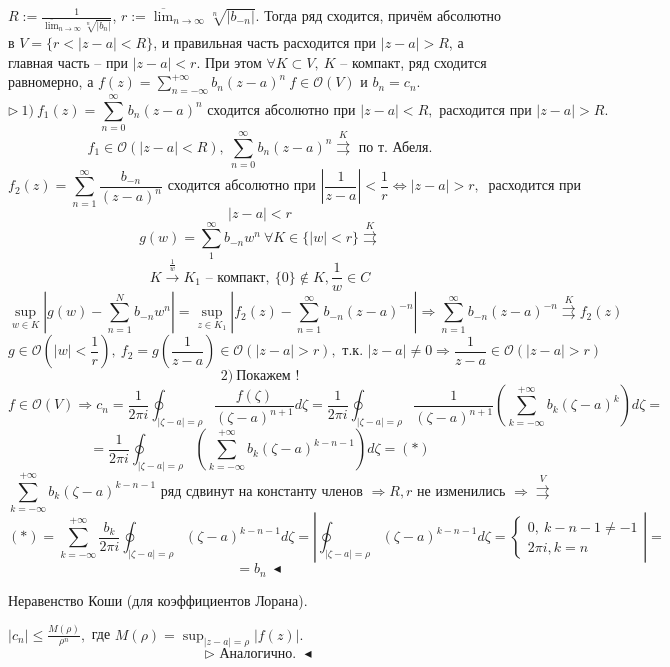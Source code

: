 $R := \frac{1}{\overline{\lim}_{n\to\infty} \sqrt[n]{|b_n|}}$, $r:= \overline{\lim}_{n\to\infty} \sqrt[n]{|b_{-n}|}.$ Тогда ряд сходится, причём абсолютно в $V = \{r < |z-a| < R\}$, и правильная часть расходится при $|z-a|>R$, а главная часть -- при $|z-a| < r$.
При этом $\forall K \subset V, \ K$ -- компакт, ряд сходится равномерно, а $f(z) = \sum_{n=-\infty}^{+\infty} b_n (z-a)^n \ f \in \mathcal{O}(V)$ и $b_n = c_n$.
\[\triangleright \ 1) \ f_1(z) = \sum_{n=0}^\infty b_n (z-a)^n \text{ сходится абсолютно при } |z-a| < R, \text{ расходится при } |z-a| > R.\]
\[f_1 \in \mathcal{O}(|z-a|< R), \ \sum_{n=0}^\infty b_n (z-a)^n \overset{K}{\rightrightarrows} \text{ по т. Абеля.}\]
\[f_2(z) = \sum_{n=1}^\infty \frac{b_{-n}}{(z-a)^n} \text{ сходится абсолютно при } \left|\frac{1}{z-a}\right| < \frac{1}{r} \Leftrightarrow |z-a| > r, \ \text{ расходится при}\]
\[|z-a| < r\]
\[g(w) = \sum_{1}^\infty b_{-n}w^n \ \forall K \in \{|w| < r\} \overset{K}{\rightrightarrows}\]
\[K \overset{\frac{1}{w}}{\to} K_1 \text{ -- компакт}, \ \{0\} \notin K, \frac{1}{w} \in C\]
\[\sup_{w \in K} \left|g(w)-\sum_{n=1}^N b_{-n} w^n\right| = \sup_{z \in K_1} \left|f_2(z) - \sum_{n=1}^\infty b_{-n} (z-a)^{-n}\right| \Rightarrow \sum_{n=1}^\infty b_{-n} (z-a)^{-n} \overset{K}{\rightrightarrows} f_2(z)\]
\[g \in \mathcal{O}(|w|<\frac{1}{r}), \ f_2 = g\left(\frac{1}{z-a}\right) \in \mathcal{O}(|z-a|>r), \text{ т.к. } |z-a|\neq 0 \Rightarrow \frac{1}{z-a} \in \mathcal{O}(|z-a|>r)\]
\[2) \ \text{Покажем } !\]
\[f \in \mathcal{O}(V) \Rightarrow c_n = \frac{1}{2\pi i} \oint_{|\zeta-a|=\rho} \frac{f(\zeta)}{(\zeta-a)^{n+1}}d\zeta = \frac{1}{2\pi i} \oint_{|\zeta-a|=\rho} \frac{1}{(\zeta-a)^{n+1}} \left(\sum_{k=-\infty}^{+\infty} b_k (\zeta-a)^k\right)d\zeta =\] 
\[=\frac{1}{2\pi i} \oint_{|\zeta-a|=\rho} \left(\sum_{k=-\infty}^{+\infty} b_k (\zeta-a)^{k-n-1}\right)d\zeta = (*)\]
\[\sum_{k=-\infty}^{+\infty} b_k (\zeta-a)^{k-n-1} \text{ ряд сдвинут на константу членов } \Rightarrow R, r \text{ не изменились } \Rightarrow \overset{V}{\rightrightarrows}\]
\[(*) = \sum_{k=-\infty}^{+\infty} \frac{b_k}{2\pi i} \oint_{|\zeta-a|=\rho} (\zeta-a)^{k-n-1} d\zeta = \left|\oint_{|\zeta-a|=\rho} (\zeta-a)^{k-n-1} d\zeta = \begin{cases}
    0, \ k-n-1\neq -1 \\
    2\pi i, k = n
\end{cases}\right| =\]
\[ = b_n \ \blacktriangleleft\]

 Неравенство Коши (для коэффициентов Лорана). 

$|c_n| \leq \frac{M(\rho)}{\rho^n},$ где $M(\rho) = \sup_{|z-a|=\rho} |f(z)|.$
\[\triangleright \text{ Аналогично. } \blacktriangleleft\]


